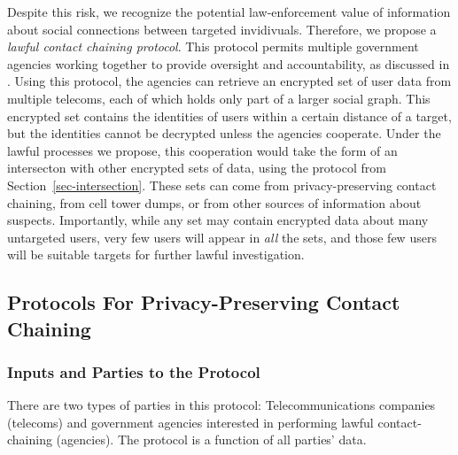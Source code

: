 Despite this risk, we recognize the potential law-enforcement value of information about social connections between targeted invidivuals. Therefore, we propose a \emph{lawful contact chaining protocol}. This protocol permits multiple government agencies working together to provide oversight and accountability, as discussed in \cite{sff-foci2014}. Using this protocol, the agencies can retrieve an encrypted set of user data from multiple telecoms, each of which holds only part of a larger social graph. This encrypted set contains the identities of users within a certain distance of a target, but the identities cannot be decrypted unless the agencies cooperate. Under the lawful processes we propose, this cooperation would take the form of an intersecton with other encrypted sets of data, using the protocol from Section~\ref{sec-intersection}. These sets can come from privacy-preserving contact chaining, from cell tower dumps, or from other sources of information about suspects. Importantly, while any set may contain encrypted data about many untargeted users, very few users will appear in \emph{all} the sets, and those few users will be suitable targets for further lawful investigation.



\subsection{Protocols For Privacy-Preserving Contact Chaining}

\label{sec:proto}






\subsubsection{Inputs and Parties to the Protocol}



There are two types of parties in this protocol: Telecommunications companies (telecoms) and government agencies interested in performing lawful contact-chaining (agencies). The protocol is a function of all parties' data.



